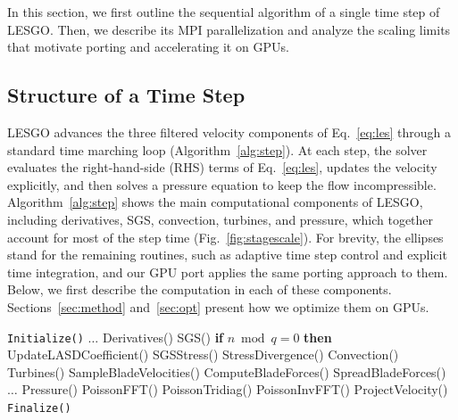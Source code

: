In this section, we first outline the sequential algorithm of a 
single time step of LESGO. Then, we describe its MPI parallelization and 
analyze the scaling limits that motivate porting and accelerating it on GPUs.

\subsection{Structure of a Time Step}
\label{sec:step}

LESGO advances the three filtered velocity components of
Eq.~\ref{eq:les} through a standard time marching loop
(Algorithm~\ref{alg:step}). At each step, the solver evaluates the 
right-hand-side (RHS) terms of Eq.~\ref{eq:les}, updates the 
velocity explicitly, and then solves a pressure equation to keep 
the flow incompressible. Algorithm~\ref{alg:step} shows the main
computational components of LESGO, including derivatives, SGS,
convection, turbines, and pressure, which together account for most of
the step time (Fig.~\ref{fig:stagescale}). For brevity, the ellipses stand for the remaining routines, such as
adaptive time step control and explicit time integration, and 
our GPU port applies the same porting approach to them. Below, we
first describe the computation in each of these components.
Sections~\ref{sec:method} and~\ref{sec:opt} present how we
optimize them on GPUs.

\begin{algorithm}[h]
\caption{The main time loop of LESGO, with other routines elided.}
\label{alg:step}
\begin{algorithmic}[1]
\STATE \texttt{Initialize()}
\STATE $\ldots$
\STATE \textcolor{stgderiv}{Derivatives()}
\STATE \textcolor{stgsgs}{SGS()}
\STATE \hspace{1.3em}\textbf{if} $n \bmod q = 0$ \textbf{then}
\STATE \hspace{2.6em}\textcolor{stgsgs}{UpdateLASDCoefficient()}
\STATE \hspace{1.3em}\textcolor{stgsgs}{SGSStress()}
\STATE \hspace{1.3em}\textcolor{stgsgs}{StressDivergence()}
\STATE \textcolor{stgconv}{Convection()}
\STATE \textcolor{stgturb}{Turbines()}
\STATE \hspace{1.3em}\textcolor{stgturb}{SampleBladeVelocities()}
\STATE \hspace{1.3em}\textcolor{stgturb}{ComputeBladeForces()}
\STATE \hspace{1.3em}\textcolor{stgturb}{SpreadBladeForces()}
\STATE $\ldots$
\STATE \textcolor{stgpress}{Pressure()}
\STATE \hspace{1.3em}\textcolor{stgpress}{PoissonFFT()}
\STATE \hspace{1.3em}\textcolor{stgpress}{PoissonTridiag()}
\STATE \hspace{1.3em}\textcolor{stgpress}{PoissonInvFFT()}
\STATE \textcolor{stgproj}{ProjectVelocity()}
\ENDFOR
\STATE \texttt{Finalize()}
\end{algorithmic}
\end{algorithm}

